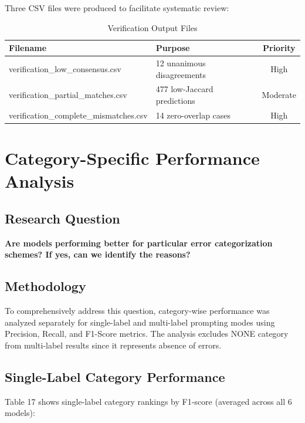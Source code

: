 \documentclass[12pt,a4paper]{article}
\begin{document}
Three CSV files were produced to facilitate systematic review:

\begin{table}[H]
\centering
\begin{tabular}{llc}
\toprule
\textbf{Filename} & \textbf{Purpose} & \textbf{Priority} \\
\midrule
verification\_low\_consensus.csv & 12 unanimous disagreements & High \\
verification\_partial\_matches.csv & 477 low-Jaccard predictions & Moderate \\
verification\_complete\_mismatches.csv & 14 zero-overlap cases & High \\
\bottomrule
\end{tabular}
\caption{Verification Output Files}

\end{table}

\newpage

\section{Category-Specific Performance Analysis}

\subsection{Research Question}

\textbf{Are models performing better for particular error categorization schemes? If yes, can we identify the reasons?}

\subsection{Methodology}

To comprehensively address this question, category-wise performance was analyzed separately for single-label and multi-label prompting modes using Precision, Recall, and F1-Score metrics. The analysis excludes NONE category from multi-label results since it represents absence of errors.

\subsection{Single-Label Category Performance}

Table 17 shows single-label category rankings by F1-score (averaged across all 6 models):
\end{document}
